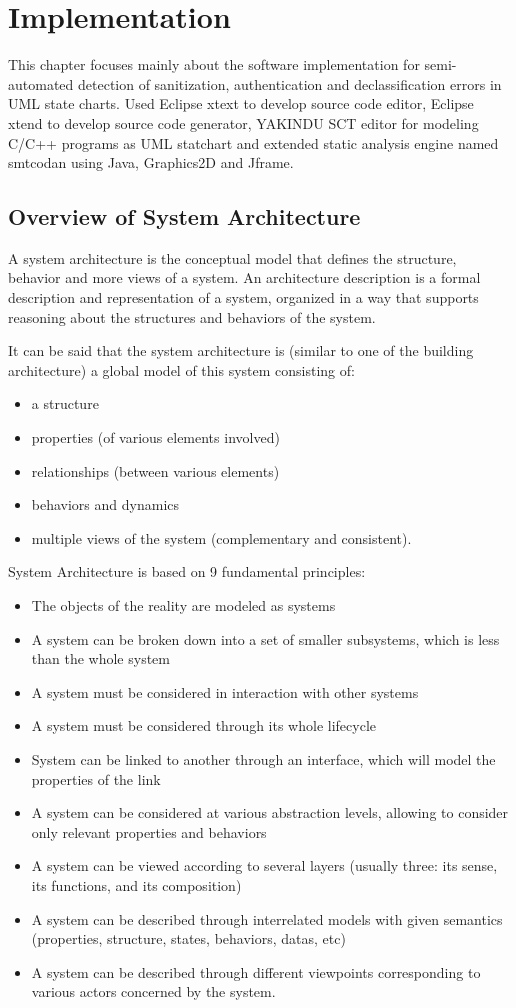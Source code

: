 \chapter{Implementation}
This chapter focuses mainly about the software implementation for semi-automated detection of sanitization, authentication and declassification errors in UML state charts. Used Eclipse xtext to develop source code editor, Eclipse xtend to develop source code generator, YAKINDU SCT editor for modeling C/C++ programs as UML statchart and extended static analysis engine named smtcodan using Java, Graphics2D and Jframe. 

\section{Overview of System Architecture}

A system architecture is the conceptual model that defines the structure, behavior and more views of a system. An architecture description is a formal description and representation of a system, organized in a way that supports reasoning about the structures and behaviors of the system.

It can be said that the system architecture is (similar to one of the building architecture)  a global model of this system consisting of:
\begin{itemize}
	\item   a structure
	\item	properties (of various elements involved)
	\item	relationships (between various elements)
	\item	behaviors and dynamics
	\item	multiple views of the system (complementary and consistent).
\end{itemize}

System Architecture is based on 9 fundamental principles:
\begin{itemize}
	\item The objects of the reality are modeled as systems
	\item A system can be broken down into a set of smaller subsystems, which is less than the whole system
	\item A system must be considered in interaction with other systems
	\item A system must be considered through its whole lifecycle
	\item System can be linked to another through an interface, which will model the properties of the link
	\item A system can be considered at various abstraction levels, allowing to consider only relevant properties and behaviors
	\item A system can be viewed according to several layers (usually three: its sense, its functions, and its composition)
	\item A system can be described through interrelated models with given semantics (properties, structure, states, behaviors, datas, etc)
	\item A system can be described through different viewpoints corresponding to various actors concerned by the system.
\end{itemize}

